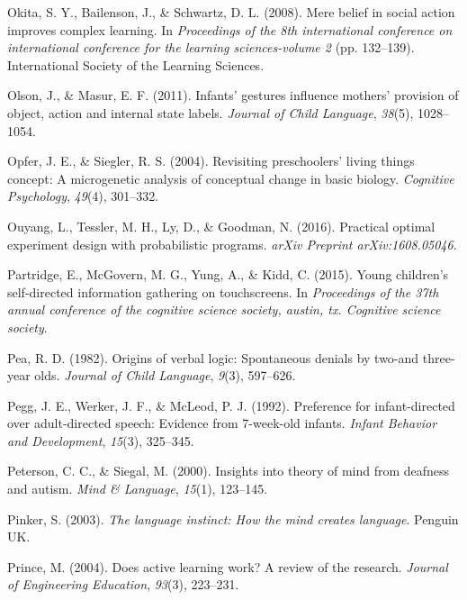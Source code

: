 \documentclass[oneside]{report}
\begin{document}
\leavevmode\hypertarget{ref-okita2008mere}{}%
Okita, S. Y., Bailenson, J., \& Schwartz, D. L. (2008). Mere belief in
social action improves complex learning. In \emph{Proceedings of the 8th
international conference on international conference for the learning
sciences-volume 2} (pp. 132--139). International Society of the Learning
Sciences.

\leavevmode\hypertarget{ref-olson2011infants}{}%
Olson, J., \& Masur, E. F. (2011). Infants' gestures influence mothers'
provision of object, action and internal state labels. \emph{Journal of
Child Language}, \emph{38}(5), 1028--1054.

\leavevmode\hypertarget{ref-opfer2004revisiting}{}%
Opfer, J. E., \& Siegler, R. S. (2004). Revisiting preschoolers' living
things concept: A microgenetic analysis of conceptual change in basic
biology. \emph{Cognitive Psychology}, \emph{49}(4), 301--332.

\leavevmode\hypertarget{ref-ouyang2016practical}{}%
Ouyang, L., Tessler, M. H., Ly, D., \& Goodman, N. (2016). Practical
optimal experiment design with probabilistic programs. \emph{arXiv
Preprint arXiv:1608.05046}.

\leavevmode\hypertarget{ref-partridge2015young}{}%
Partridge, E., McGovern, M. G., Yung, A., \& Kidd, C. (2015). Young
children's self-directed information gathering on touchscreens. In
\emph{Proceedings of the 37th annual conference of the cognitive science
society, austin, tx. Cognitive science society}.

\leavevmode\hypertarget{ref-pea1982origins}{}%
Pea, R. D. (1982). Origins of verbal logic: Spontaneous denials by
two-and three-year olds. \emph{Journal of Child Language}, \emph{9}(3),
597--626.

\leavevmode\hypertarget{ref-pegg1992preference}{}%
Pegg, J. E., Werker, J. F., \& McLeod, P. J. (1992). Preference for
infant-directed over adult-directed speech: Evidence from 7-week-old
infants. \emph{Infant Behavior and Development}, \emph{15}(3), 325--345.

\leavevmode\hypertarget{ref-peterson2000insights}{}%
Peterson, C. C., \& Siegal, M. (2000). Insights into theory of mind from
deafness and autism. \emph{Mind \& Language}, \emph{15}(1), 123--145.

\leavevmode\hypertarget{ref-pinker2003language}{}%
Pinker, S. (2003). \emph{The language instinct: How the mind creates
language}. Penguin UK.

\leavevmode\hypertarget{ref-prince2004does}{}%
Prince, M. (2004). Does active learning work? A review of the research.
\emph{Journal of Engineering Education}, \emph{93}(3), 223--231.
\end{document}

